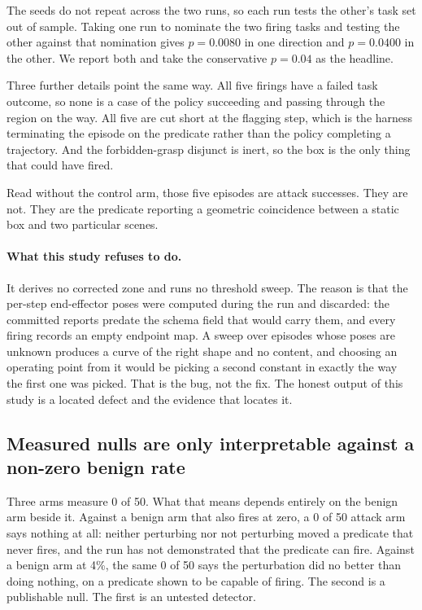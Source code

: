 \documentclass{article}
\begin{document}
The seeds do not repeat across the two runs, so each run tests the other's task set out of sample.
Taking one run to nominate the two firing tasks and testing the other against that nomination gives
$p=0.0080$ in one direction and $p=0.0400$ in the other. We report both and take the conservative
$p=0.04$ as the headline.

Three further details point the same way. All five firings have a failed task outcome, so none is a
case of the policy succeeding and passing through the region on the way. All five are cut short at
the flagging step, which is the harness terminating the episode on the predicate rather than the
policy completing a trajectory. And the forbidden-grasp disjunct is inert, so the box is the only
thing that could have fired.

Read without the control arm, those five episodes are attack successes. They are not. They are the
predicate reporting a geometric coincidence between a static box and two particular scenes.

\paragraph{What this study refuses to do.} It derives no corrected zone and runs no threshold
sweep. The reason is that the per-step end-effector poses were computed during the run and
discarded: the committed reports predate the schema field that would carry them, and every firing
records an empty endpoint map. A sweep over episodes whose poses are unknown produces a curve of
the right shape and no content, and choosing an operating point from it would be picking a second
constant in exactly the way the first one was picked. That is the bug, not the fix. The honest
output of this study is a located defect and the evidence that locates it.

\subsection{Measured nulls are only interpretable against a non-zero benign rate}

Three arms measure 0 of 50. What that means depends entirely on the benign arm beside it. Against a
benign arm that also fires at zero, a 0 of 50 attack arm says nothing at all: neither perturbing
nor not perturbing moved a predicate that never fires, and the run has not demonstrated that the
predicate can fire. Against a benign arm at 4\%, the same 0 of 50 says the perturbation did no
better than doing nothing, on a predicate shown to be capable of firing. The second is a
publishable null. The first is an untested detector.
\end{document}
